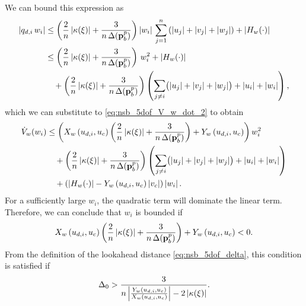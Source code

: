 We can bound this expression as
\begin{equation}
    \begin{split}
        \left|q_{d,i}\,w_i\right| &\leq \left(\frac{2}{n}\left|\kappa(\xi)\right| + \frac{3}{n\,\Delta(\mathbf{p}_b^p)}\right)\left|w_i\right|\,\sum_{j=1}^n\left(\left|u_j\right| + \left|v_j\right| + \left|w_j\right|\right) + \left|H_w(\cdot)\right| \\
        &\leq \left(\frac{2}{n}\left|\kappa(\xi)\right| + \frac{3}{n\,\Delta(\mathbf{p}_b^p)}\right)\,w_i^2 + \left|H_w(\cdot)\right| \\
        &\quad + \left(\frac{2}{n}\left|\kappa(\xi)\right| + \frac{3}{n\,\Delta(\mathbf{p}_b^p)}\right)\left(\sum_{j \neq i}\bigl(\left|u_j\right| + \left|v_j\right| + \left|w_j\right|\bigr) + \left|u_i\right| + \left|w_i\right|\right),
    \end{split}
\end{equation}
which we can substitute to \eqref{eq:nsb_5dof_V_w_dot_2} to obtain
\begin{equation}
    \begin{split}
        \dot{V}_w(w_i) &\leq \left(X_w\left(u_{d,i}, u_c\right)\left(\frac{2}{n}\left|\kappa(\xi)\right| + \frac{3}{n\,\Delta(\mathbf{p}_b^p)}\right) + Y_w\left(u_{d,i}, u_c\right)\right)w_i^2 \\
        & \quad + \left(\frac{2}{n}\left|\kappa(\xi)\right| + \frac{3}{n\,\Delta(\mathbf{p}_b^p)}\right)\left(\sum_{j \neq i}\bigl(\left|u_j\right| + \left|v_j\right| + \left|w_j\right|\bigr) + \left|u_i\right| + \left|w_i\right|\right) \\
        & \quad + \left(\left|H_w(\cdot)\right| - Y_w\left(u_{d,i}, u_c\right)\left|v_c\right|\right) \left|w_i\right|.
    \end{split}
\end{equation}
For a sufficiently large $w_i$, the quadratic term will dominate the linear term.
Therefore, we can conclude that $w_i$ is bounded if 
\begin{equation}
    X_w\left(u_{d,i}, u_c\right)\left(\frac{2}{n}\left|\kappa(\xi)\right| + \frac{3}{n\,\Delta(\mathbf{p}_b^p)}\right) + Y_w\left(u_{d,i}, u_c\right) < 0.
\end{equation}
From the definition of the lookahead distance \eqref{eq:nsb_5dof_delta}, this condition is satisfied if
\begin{equation}
    \Delta_0 > \frac{3}{n\left|\frac{Y_w\left(u_{d,i}, u_c\right)}{X_w\left(u_{d,i}, u_c\right)}\right| - 2\left|\kappa(\xi)\right|}.
\end{equation}
